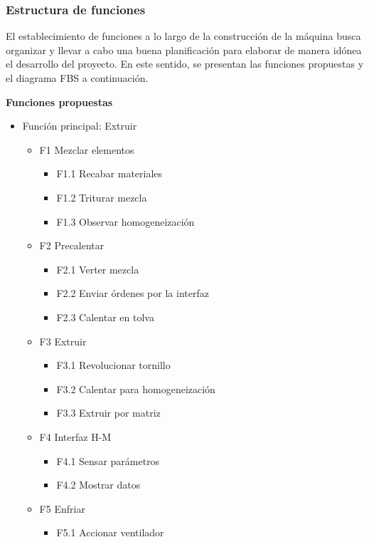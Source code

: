 \documentclass[14pt,oneside]{extarticle} %
\begin{document}
\subsubsection{Estructura de funciones}
El establecimiento de funciones a lo largo de la construcción de la máquina busca organizar y llevar a cabo una buena planificación para elaborar de manera idónea el desarrollo del proyecto. En este sentido, se presentan las funciones propuestas y el diagrama FBS a continuación.

\textbf{Funciones propuestas}
\begin{itemize}
    \item Función principal: Extruir
    \begin{itemize}
        \item F1 Mezclar elementos
        \begin{itemize}
            \item F1.1 Recabar materiales
            \item F1.2 Triturar mezcla
            \item F1.3 Observar homogeneización
        \end{itemize}
        \item F2 Precalentar
        \begin{itemize}
            \item F2.1 Verter mezcla
            \item F2.2 Enviar órdenes por la interfaz
            \item F2.3 Calentar en tolva
        \end{itemize}
        \item F3 Extruir
        \begin{itemize}
            \item F3.1 Revolucionar tornillo
            \item F3.2 Calentar para homogeneización
            \item F3.3 Extruir por matriz
        \end{itemize}
        \item F4 Interfaz H-M
        \begin{itemize}
            \item F4.1 Sensar parámetros
            \item F4.2 Mostrar datos
        \end{itemize}
        \item F5 Enfriar
        \begin{itemize}
            \item F5.1 Accionar ventilador
        \end{itemize}
    \end{itemize}
\end{itemize}
\end{document}
